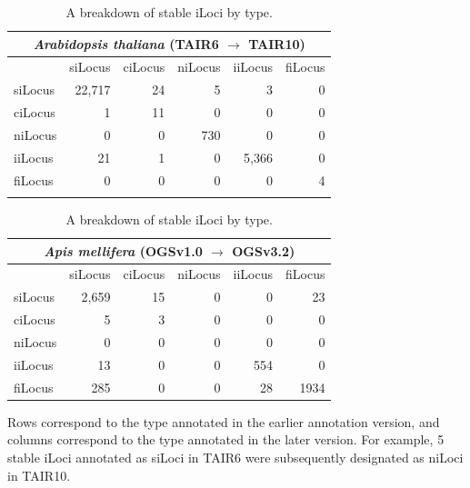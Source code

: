 \begin{table}[h]
\caption{A breakdown of stable iLoci by type.}
\label{Table:AthaAmelStableMatrix}
\begin{tabularx}{\textwidth}{lrrrrr}
\multicolumn{6}{c}{\textit{Arabidopsis thaliana} (TAIR6 $\rightarrow$ TAIR10)} \\ \hline
          & siLocus  & ciLocus  & niLocus  & iiLocus  & fiLocus  \\ \hline
siLocus   & 22,717   & 24       & 5        & 3        & 0        \\
ciLocus   & 1        & 11       & 0        & 0        & 0        \\
niLocus   & 0        & 0        & 730      & 0        & 0        \\
iiLocus   & 21       & 1        & 0        & 5,366    & 0        \\
fiLocus   & 0        & 0        & 0        & 0        & 4        \\ \hline
\multicolumn{6}{c}{ } \\
\end{tabularx}
\begin{tabularx}{\textwidth}{lrrrrr}
\multicolumn{6}{c}{\textit{Apis mellifera} (OGSv1.0 $\rightarrow$ OGSv3.2)} \\ \hline
          & siLocus  & ciLocus  & niLocus  & iiLocus  & fiLocus  \\ \hline
siLocus   & 2,659    & 15       & 0        & 0        & 23       \\
ciLocus   & 5        & 3        & 0        & 0        & 0        \\
niLocus   & 0        & 0        & 0        & 0        & 0        \\
iiLocus   & 13       & 0        & 0        & 554      & 0        \\
fiLocus   & 285      & 0        & 0        & 28       & 1934     \\ \hline
\end{tabularx}
\raggedright
{\scriptsize
Rows correspond to the type annotated in the earlier annotation version, and columns correspond to the type annotated in the later version. For example, 5 stable iLoci annotated as siLoci in TAIR6 were subsequently designated as niLoci in TAIR10.
}
\end{table}


